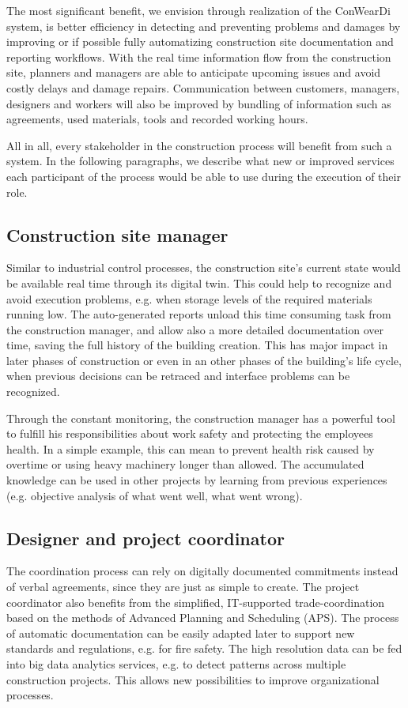 The most significant benefit, we envision through realization of the ConWearDi system, is better efficiency in detecting and preventing problems and damages by improving or if possible fully automatizing construction site documentation and reporting workflows.
With the real time information flow from the construction site, planners and managers are able to anticipate upcoming issues and avoid costly delays and damage repairs.
Communication between customers, managers, designers and workers will also be improved by bundling of information such as agreements, used materials, tools and recorded working hours. 

All in all, every stakeholder in the construction process will benefit from such a system.
In the following paragraphs, we describe what new or improved services each participant of the process would be able to use during the execution of their role.


\subsection{Construction site manager}
Similar to industrial control processes, the construction site's current state would be available real time through its digital twin.
This could help to recognize and avoid execution problems, e.g. when storage levels of the required materials running low.
The auto-generated reports unload this time consuming task from the construction manager, and allow also a more detailed documentation over time, saving the full history of the building creation.
This has major impact in later phases of construction or even in an other phases of the building's life cycle, when previous decisions can be retraced and interface problems can be recognized. 

Through the constant monitoring, the construction manager has a powerful tool to fulfill his responsibilities about work safety and protecting the employees health. In a simple example, this can mean to prevent health risk caused by overtime or using heavy machinery longer than allowed.
The accumulated knowledge can be used in other projects by learning from previous experiences (e.g. objective analysis of what went well, what went wrong).

\subsection{Designer and project coordinator}
The coordination process can rely on digitally documented commitments instead of verbal agreements, since they are just as simple to create.
The project coordinator also benefits from the simplified, IT-supported trade-coordination based on the methods of Advanced Planning and Scheduling (APS).
The process of automatic documentation can be easily adapted later to support new standards and regulations, e.g. for fire safety.
The high resolution data can be fed into big data analytics services, e.g. to detect patterns across multiple construction projects.
This allows new possibilities to improve organizational processes.

